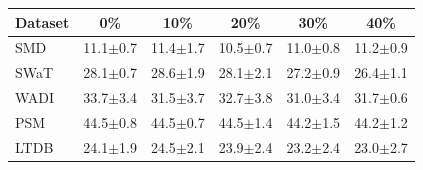 \begin{tabular}{lccccc}
    \toprule
    Dataset & 0\%          & 10\%         & 20\%         & 30\%         & 40\%         \\
    \midrule
    SMD     & 11.1$\pm$0.7 & 11.4$\pm$1.7 & 10.5$\pm$0.7 & 11.0$\pm$0.8 & 11.2$\pm$0.9 \\
    SWaT    & 28.1$\pm$0.7 & 28.6$\pm$1.9 & 28.1$\pm$2.1 & 27.2$\pm$0.9 & 26.4$\pm$1.1 \\
    WADI    & 33.7$\pm$3.4 & 31.5$\pm$3.7 & 32.7$\pm$3.8 & 31.0$\pm$3.4 & 31.7$\pm$0.6 \\
    PSM     & 44.5$\pm$0.8 & 44.5$\pm$0.7 & 44.5$\pm$1.4 & 44.2$\pm$1.5 & 44.2$\pm$1.2 \\
    LTDB    & 24.1$\pm$1.9 & 24.5$\pm$2.1 & 23.9$\pm$2.4 & 23.2$\pm$2.4 & 23.0$\pm$2.7 \\
    \bottomrule
\end{tabular}
